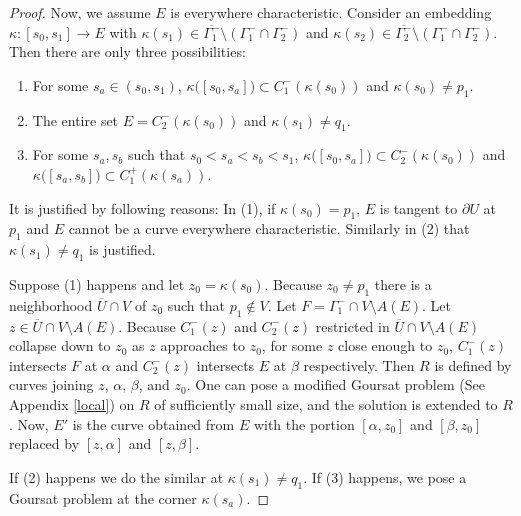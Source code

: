 \documentclass[11pt]{amsart}
\theoremstyle{plain}
\theoremstyle{remark}
\numberwithin{equation}{section}
\numberwithin{Thm}{section}
\def\U{\overline{U}}
\def\N{{\mathbf N}}
\begin{document}
\begin{proof}
Now, we assume $E$ is everywhere characteristic. Consider an embedding $\kappa:[s_0,s_1] \rightarrow E$ with $\kappa(s_1) \in \overline{\Gamma^-_1} \setminus (\Gamma_1^- \cap \Gamma_2^-)$ and $\kappa(s_2) \in \overline{\Gamma^-_2} \setminus (\Gamma_1^- \cap \Gamma_2^-)$. Then there are only three possibilities:
\begin{enumerate}
 \item For some $s_a \in (s_0,s_1)$, $\kappa\big([s_0,s_a]\big) \subset C^-_1(\kappa(s_0))$ and $\kappa(s_0)\ne p_1$.
 \item The entire set $E = C^-_2(\kappa(s_0))$ and $\kappa(s_1)\ne q_1$.
 \item For some $s_a, s_b$ such that $s_0 < s_a < s_b <s_1$, $\kappa\big([s_0,s_a]\big) \subset C^-_2(\kappa(s_0))$  and $\kappa\big([s_a,s_b]\big) \subset C^+_1(\kappa(s_a))$.
\end{enumerate}
It is justified by following reasons: In (1), if $\kappa(s_0)=p_1$, $E$ is tangent to $\partial U$ at $p_1$ and $E$ cannot be a curve everywhere characteristic. Similarly in (2) that $\kappa(s_1)\ne q_1$ is justified.

Suppose (1) happens and let $z_0=\kappa(s_0)$. Because $z_0\ne p_1$ there is a neighborhood $\U \cap V$ of $z_0$ such that $p_1\notin V$. Let $F=\Gamma^-_1 \cap V \setminus A(E)$. Let $z \in \U\cap V \setminus A(E)$. Because $C^-_1(z)$ and $C^-_2(z)$ restricted in $\U\cap V \setminus A(E)$ collapse down to $z_0$ as $z$ approaches to $z_0$, for some $z$ close enough to $z_0$, $C^-_1(z)$ intersects $F$ at $\alpha$ and $C^-_2(z)$ intersects $E$ at $\beta$ respectively. Then $R$ is defined by curves joining $z$, $\alpha$, $\beta$, and $z_0$. One can pose a modified Goursat problem (See Appendix \ref{local}) on $R$ of sufficiently small size, and the solution is extended to $R$. Now, $E'$ is the curve obtained from $E$ with the portion $[\alpha,z_0]$ and $[\beta,z_0]$ replaced by $[z,\alpha]$ and $[z,\beta]$.

If (2) happens we do the similar at $\kappa(s_1)\ne q_1$. If (3) happens, we pose a Goursat problem at the corner $\kappa(s_a)$.

% 
% 

\end{proof}
\end{document}
